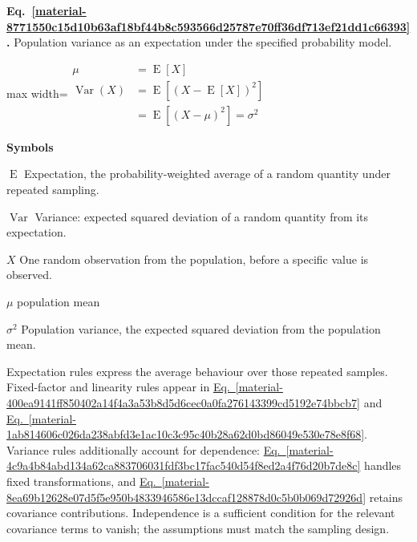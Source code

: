 \documentclass[11pt,a4paper]{article}
\begin{document}
\par\medskip
\noindent\begin{minipage}{\linewidth}
\label{material-8771550c15d10b63af18bf44b8c593566d25787e70ff36df713ef21dd1c66393}
\noindent\textbf{Eq.~\ref*{material-8771550c15d10b63af18bf44b8c593566d25787e70ff36df713ef21dd1c66393}.} Population variance as an expectation under the specified probability model.\par\nopagebreak
\begin{center}\begin{adjustbox}{max width=\linewidth}$\displaystyle \begin{aligned}\mu&=\operatorname{E}[X]\\\operatorname{Var}(X)&=\operatorname{E}[(X-\operatorname{E}[X])^2]\\&=\operatorname{E}[(X-\mu)^2]=\sigma^2\end{aligned}$\end{adjustbox}\end{center}

\par\noindent\textbf{Symbols}

\par\noindent\textbf{\(\operatorname{E}\)} Expectation, the probability-weighted average of a random quantity under repeated sampling.

\par\noindent\textbf{\(\operatorname{Var}\)} Variance: expected squared deviation of a random quantity from its expectation.

\par\noindent\textbf{\(X\)} One random observation from the population, before a specific value is observed.

\par\noindent\textbf{\(\mu\)} population mean

\par\noindent\textbf{\(\sigma^2\)} Population variance, the expected squared deviation from the population mean.

\end{minipage}\par
\medskip

Expectation rules express the average behaviour over those repeated samples. Fixed-factor and linearity rules appear in \hyperref[material-400ea9141ff850402a14f4a3a53b8d5d6cec0a0fa276143399cd5192e74bbcb7]{Eq.~\ref*{material-400ea9141ff850402a14f4a3a53b8d5d6cec0a0fa276143399cd5192e74bbcb7}} and \hyperref[material-1ab814606c026da238abfd3e1ac10c3c95c40b28a62d0bd86049e530e78e8f68]{Eq.~\ref*{material-1ab814606c026da238abfd3e1ac10c3c95c40b28a62d0bd86049e530e78e8f68}}. Variance rules additionally account for dependence: \hyperref[material-4c9a4b84abd134a62ca883706031fdf3bc17fac540d54f8ed2a4f76d20b7de8c]{Eq.~\ref*{material-4c9a4b84abd134a62ca883706031fdf3bc17fac540d54f8ed2a4f76d20b7de8c}} handles fixed transformations, and \hyperref[material-8ea69b12628e07d5f5e950b4833946586e13dccaf128878d0c5b0b069d72926d]{Eq.~\ref*{material-8ea69b12628e07d5f5e950b4833946586e13dccaf128878d0c5b0b069d72926d}} retains covariance contributions. Independence is a sufficient condition for the relevant covariance terms to vanish; the assumptions must match the sampling design.
\end{document}
